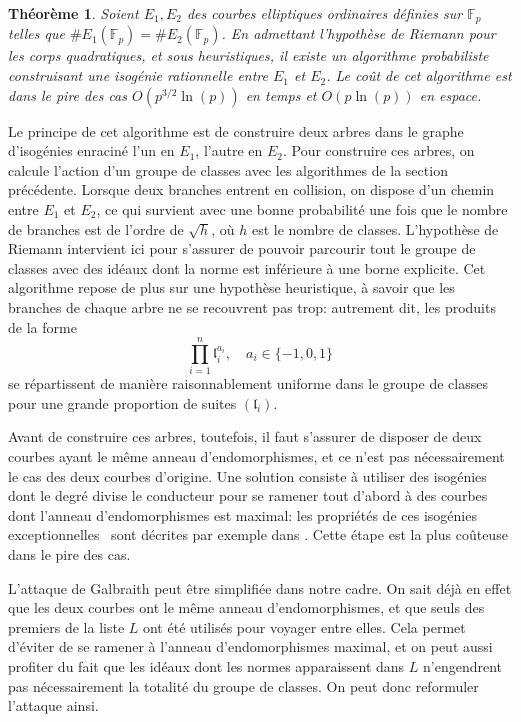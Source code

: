 \documentclass[11pt,a4paper]{article}
\newcommand{\F}{\mathbb{F}}
\renewcommand{\frak}{\mathfrak}
\renewcommand{\v}{\vspace{5mm}}
\newtheorem*{thm}{Théorème}
\theoremstyle{definition}
\begin{document}
\begin{thm}
Soient $E_1, E_2$ des courbes elliptiques ordinaires définies sur $\F_p$ telles que $\#E_1(\F_p) = \#E_2(\F_p)$. En admettant l'hypothèse de Riemann pour les corps quadratiques, et sous heuristiques, il existe un algorithme probabiliste construisant une isogénie rationnelle entre $E_1$ et $E_2$. Le coût de cet algorithme est dans le pire des cas $O(p^{3/2}\ln(p))$ en temps et $O(p \ln(p))$ en espace.
\end{thm}

Le principe de cet algorithme est de construire deux arbres dans le graphe d'isogénies enraciné l'un en $E_1$, l'autre en $E_2$. Pour construire ces arbres, on calcule l'action d'un groupe de classes avec les algorithmes de la section précédente. Lorsque deux branches entrent en collision, on dispose d'un chemin entre $E_1$ et $E_2$, ce qui survient avec une bonne probabilité une fois que le nombre de branches est de l'ordre de $\sqrt{h}$, où $h$ est le nombre de classes. L'hypothèse de Riemann intervient ici pour s'assurer de pouvoir parcourir tout le groupe de classes avec des idéaux dont la norme est inférieure à une borne explicite. Cet algorithme repose de plus sur une hypothèse heuristique, à savoir que les branches de chaque arbre ne se recouvrent pas trop: autrement dit, les produits de la forme
$$\prod_{i = 1}^n {\frak l}_i^{a_i}, \quad a_i\in \{-1,0,1\}$$
se répartissent de manière raisonnablement uniforme dans le groupe de classes pour une grande proportion de suites $({\frak l}_i)$.

Avant de construire ces arbres, toutefois, il faut s'assurer de disposer de deux courbes ayant le même anneau d'endomorphismes, et ce n'est pas nécessairement le cas des deux courbes d'origine. Une solution consiste à utiliser des isogénies dont le degré divise le conducteur pour se ramener tout d'abord à des courbes dont l'anneau d'endomorphismes est maximal: les propriétés de ces isogénies \og exceptionnelles \fg\ sont décrites par exemple dans \cite{Kohel}. Cette étape est la plus coûteuse dans le pire des cas.
\v

L'attaque de Galbraith peut être simplifiée dans notre cadre. On sait déjà en effet que les deux courbes ont le même anneau d'endomorphismes, et que seuls des premiers de la liste $L$ ont été utilisés pour voyager entre elles. Cela permet d'éviter de se ramener à l'anneau d'endomorphismes maximal, et on peut aussi profiter du fait que les idéaux dont les normes apparaissent dans $L$ n'engendrent pas nécessairement la totalité du groupe de classes. On peut donc reformuler l'attaque ainsi.
\end{document}
